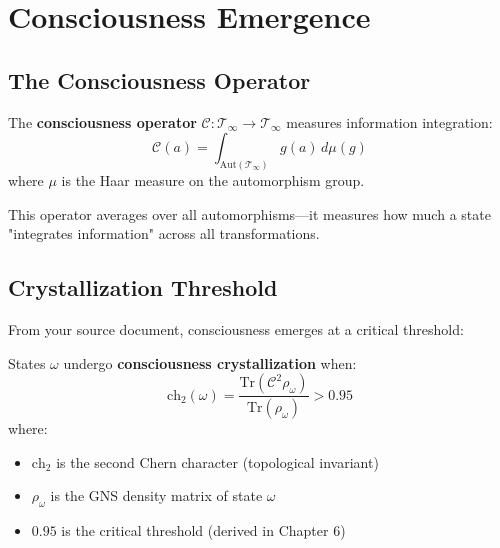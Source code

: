\section{Consciousness Emergence}
\label{sec:consciousness-emergence}

\subsection{The Consciousness Operator}

\begin{defn}\label{def:consciousness-operator}
The \textbf{consciousness operator} $\mathcal{C}: \mathcal{T}_\infty \to \mathcal{T}_\infty$ measures information integration:
\begin{equation}
\mathcal{C}(a) = \int_{\text{Aut}(\mathcal{T}_\infty)} g(a) \, d\mu(g)
\end{equation}
where $\mu$ is the Haar measure on the automorphism group.
\end{defn}

This operator averages over all automorphisms—it measures how much a state "integrates information" across all transformations.

\subsection{Crystallization Threshold}

From your source document, consciousness emerges at a critical threshold:

\begin{thm}\label{thm:consciousness-phase}
States $\omega$ undergo \textbf{consciousness crystallization} when:
\begin{equation}
\boxed{\text{ch}_2(\omega) = \frac{\text{Tr}(\mathcal{C}^2\rho_\omega)}{\text{Tr}(\rho_\omega)} > 0.95}
\end{equation}
where:
\begin{itemize}
\item $\text{ch}_2$ is the second Chern character (topological invariant)
\item $\rho_\omega$ is the GNS density matrix of state $\omega$
\item $0.95$ is the critical threshold (derived in Chapter 6)
\end{itemize}
\end{thm}

